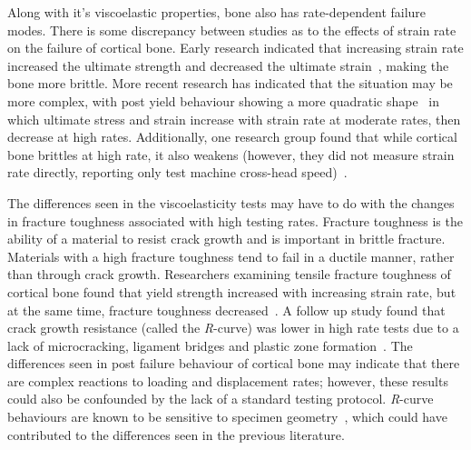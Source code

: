 Along with it's viscoelastic properties, bone also has rate-dependent failure modes.
There is some discrepancy between studies as to the effects of strain rate on the failure of cortical bone.
Early research indicated that increasing strain rate increased the ultimate strength and decreased the ultimate strain~\citep{carter_bone_1976, crowninshield_response_1974, wright_tensile_1976}, making the bone more brittle.
More recent research has indicated that the situation may be more complex, with post yield behaviour showing a more quadratic shape~\citep{evans_response_1992, hansen_effect_2008, zioupos_microcracking_2008, currey_effects_1975} in which ultimate stress and strain increase with strain rate at moderate rates, then decrease at high rates.
Additionally, one research group found that while cortical bone brittles at high rate, it also weakens (however, they did not measure strain rate directly, reporting only test machine cross-head speed)~\citep{pithioux_comparison_2004}.

The differences seen in the viscoelasticity tests may have to do with the changes in fracture toughness associated with high testing rates.
Fracture toughness is the ability of a material to resist crack growth and is important in brittle fracture.
Materials with a high fracture toughness tend to fail in a ductile manner, rather than through crack growth.
Researchers examining tensile fracture toughness of cortical bone found that yield strength increased with increasing strain rate, but at the same time, fracture toughness decreased~\citep{kulin_effects_2011}.
A follow up study found that crack growth resistance (called the \textit{R}-curve) was lower in high rate tests due to a lack of microcracking, ligament bridges and plastic zone formation~\citep{kulin_loading_2011}.
The differences seen in post failure behaviour of cortical bone may indicate that there are complex reactions to loading and displacement rates; however, these results could also be confounded by the lack of a standard testing protocol.
\textit{R}-curve behaviours are known to be sensitive to specimen geometry~\citep[Chapter~5]{gdoutos_fracture_2005}, which could have contributed to the differences seen in the previous literature.

